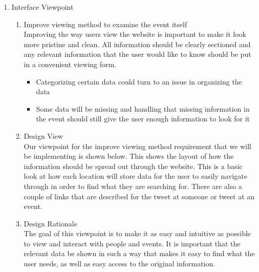 \documentclass[draftclsnofoot,10pt,onecolumn]{IEEEtran} %
\begin{document}
\begin{enumerate}
\begin{enumerate}
		\item Interface Viewpoint \\
			\begin{enumerate}
				\item Improve viewing method to examine the event itself \\
				Improving the way users view the website is important to make it look more pristine and clean. All
				information should be clearly sectioned and any relevant information that the user would like to know
				should be put in a convenient viewing form.
				\begin{itemize}
					\item Categorizing certain data could turn to an issue in organizing the data
					\item Some data will be missing and handling that missing information in the event should still give the
					user enough information to look for it \\
				\end{itemize}
				
				\item Design View \\ %
				Our viewpoint for the improve viewing method requirement that we will be implementing is shown below.
				This shows the layout of how the information should be spread out through the website. This is a basic look
				at how each location will store data for the user to easily navigate through in order to find what they are
				searching for. There are also a couple of links that are described for the tweet at someone or tweet at an
				event. \\
				
				\item Design Rationale \\
				The goal of this viewpoint is to make it as easy and intuitive as possible to view and interact with people
				and events. It is important that the relevant data be shown in such a way that makes it easy to find what the
				user needs, as well as easy access to the original information. \\
			\end{enumerate}
			

\end{enumerate}
\end{enumerate}
\end{document}
